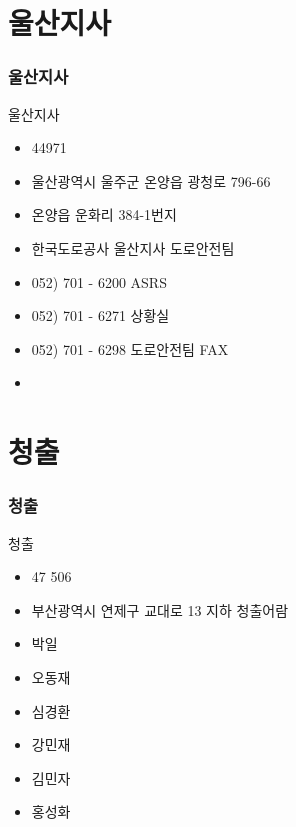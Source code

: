 \documentclass[aspectratio=1610,20pt,xcolor=pdftex,dvipsnames,table,handout]{beamer}
\begin{document}
		\section{울산지사}
		\begin{frame} [t,plain]
		\frametitle{울산지사}
			\begin{block} {울산지사}
			\setlength{\leftmargini}{2em}			
			\begin{itemize}
				\item 44971
				\item 울산광역시 울주군 온양읍 광청로 796-66
				\item 온양읍 운화리 384-1번지
				\item 한국도로공사 울산지사 도로안전팀
				\item 052) 701 - 6200 ASRS
				\item 052) 701 - 6271 상황실
				\item 052) 701 - 6298 도로안전팀 FAX
				\item 				\hrulefill

			\end{itemize}
			\end{block}						

		\end{frame}						
		

		\section{청출}
		\begin{frame} [t,plain]
		\frametitle{청출}
			\begin{block} {청출}
			\setlength{\leftmargini}{1em}			
			\begin{itemize}
				\item 	47 506
				\item 	부산광역시 연제구 교대로 13 지하 청출어람
						\\ \hrulefill

				\item 	박일 \quad \hrulefill
				\item 	오동재		\quad \hrulefill
				\item 	심경환		\quad \hrulefill
				\item 	강민재		\quad \hrulefill
				\item 	김민자		\quad \hrulefill
				\item 	홍성화		\quad \hrulefill

			\end{itemize}
			\end{block}			

								
		\end{frame}						
	
\end{document}

